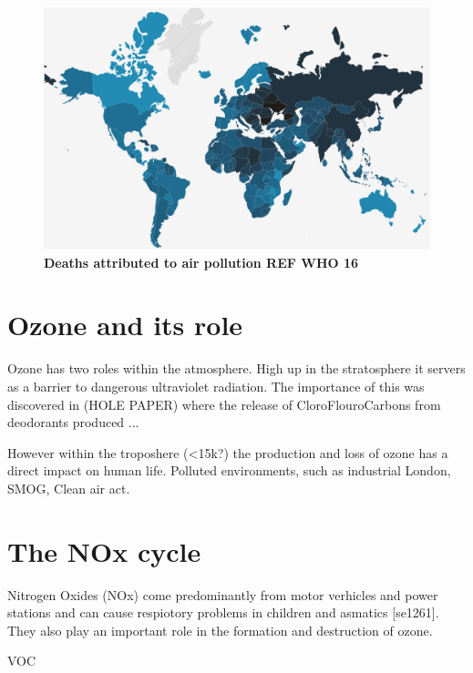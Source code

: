 \begin{figure}[H]
  \centering
  \includegraphics[width=\textwidth]{who.png}
  \caption{\textbf{Deaths attributed to air pollution REF WHO 16}}
  \label{fig:who}
\end{figure}

\section{Ozone and its role}
Ozone has two roles within the atmosphere. High up in the stratosphere it servers as a barrier to dangerous ultraviolet radiation. The importance of this was discovered in (HOLE PAPER) where the release of CloroFlouroCarbons from deodorants produced ...

However within the troposhere (<15k?) the production and loss of ozone has a direct impact on human life. Polluted environments, such as industrial London,
SMOG, Clean air act.



\section{The NOx cycle}
Nitrogen Oxides (NOx) come predominantly from motor verhicles and power stations and can cause respiotory problems in children and asmatics [se1261]. They also play an important role in the formation and destruction of ozone.








VOC
